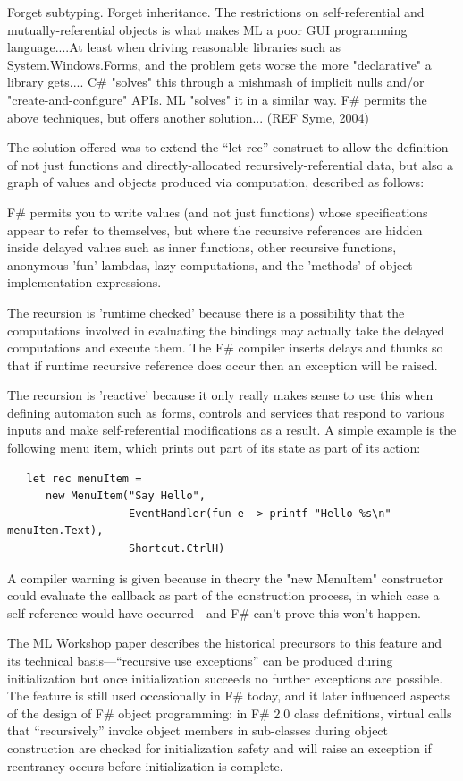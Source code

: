 \documentclass[acmsmall]{acmart}\settopmatter{}
\begin{document}
\begin{verbquote}
Forget subtyping.  Forget inheritance.   The restrictions on self-referential and mutually-referential objects is what makes ML a poor GUI programming language....At least when driving reasonable libraries such as System.Windows.Forms, and the problem gets worse the more "declarative" a library gets.... C# "solves" this through a mishmash of implicit nulls and/or "create-and-configure" APIs.   ML "solves" it in a similar way.  F# permits the above techniques, but offers another solution... (REF Syme, 2004)
\end{verbquote}
The solution offered was to extend the “let rec” construct to allow the definition of not just functions and directly-allocated recursively-referential data, but also a graph of values and objects produced via computation, described as follows:
\begin{verbquote}
F# permits you to write values (and not just functions) whose specifications appear to refer to themselves, but where the recursive references are hidden inside delayed values such as inner functions, other recursive functions, anonymous 'fun' lambdas, lazy computations, and the 'methods' of object-implementation expressions. 

The recursion is 'runtime checked' because there is a possibility that the computations involved in evaluating the bindings may actually take the delayed computations and execute them. The F# compiler inserts delays and thunks so that if runtime recursive reference does occur then an exception will be raised.

The recursion is 'reactive' because it only really makes sense to use this when defining automaton such as forms, controls and services that respond to various inputs and make self-referential modifications as a result. A simple example is the following menu item, which prints out part of its state as part of its action:
\end{verbquote}
\begin{verbatim}
   let rec menuItem = 
      new MenuItem("Say Hello", 
                   EventHandler(fun e -> printf "Hello %s\n" menuItem.Text), 
                   Shortcut.CtrlH)
\end{verbatim}
\begin{verbquote}
A compiler warning is given because in theory the "new MenuItem" constructor could evaluate the callback as part of the construction process, in which case a self-reference would have occurred - and F# can't prove this won't happen. 
\end{verbquote}
The ML Workshop paper describes the historical precursors to this feature and its technical basis---“recursive use exceptions” can be produced during initialization but once initialization succeeds no further exceptions are possible. The feature is still used occasionally in F\# today, and it later influenced aspects of the design of F\# object programming: in F\# 2.0 class definitions, virtual calls that “recursively” invoke object members in sub-classes during object construction are checked for initialization safety and will raise an exception if reentrancy occurs before initialization is complete. 
\end{document}

